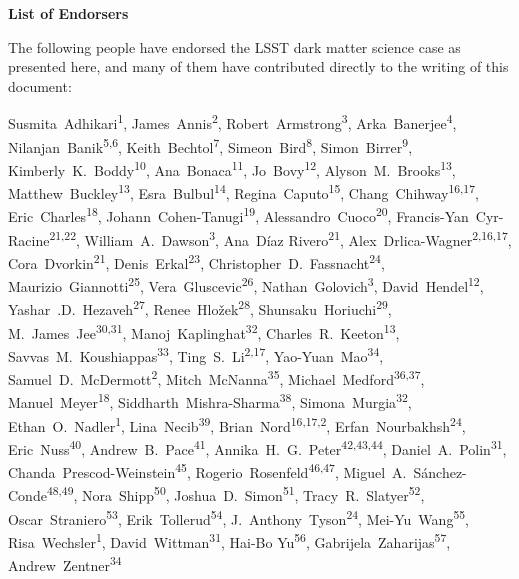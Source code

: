 
\begin{center}
  {\Large \bf List of Endorsers}
\end{center}
\bigskip

The following people have endorsed the LSST dark matter science case as presented here, and many of them have contributed directly to the writing of this document:

\def\altaffilmark#1{\textsuperscript{#1}}
\def\affil#1{\noindent #1 \\}

\normalsize
\begin{raggedright}

Susmita~Adhikari\altaffilmark{1},
James~Annis\altaffilmark{2},
Robert~Armstrong\altaffilmark{3},
Arka~Banerjee\altaffilmark{4},
Nilanjan~Banik\altaffilmark{5,6},
Keith~Bechtol\altaffilmark{7},
Simeon~Bird\altaffilmark{8},
Simon~Birrer\altaffilmark{9},
Kimberly~K.~Boddy\altaffilmark{10},
Ana~Bonaca\altaffilmark{11},
Jo~Bovy\altaffilmark{12},
Alyson~M.~Brooks\altaffilmark{13},
Matthew~Buckley\altaffilmark{13},
Esra~Bulbul\altaffilmark{14},
Regina~Caputo\altaffilmark{15},
Chang~Chihway\altaffilmark{16,17},
Eric~Charles\altaffilmark{18},
Johann~Cohen-Tanugi\altaffilmark{19},
Alessandro~Cuoco\altaffilmark{20},
Francis-Yan~Cyr-Racine\altaffilmark{21,22},
William~A.~Dawson\altaffilmark{3},
Ana~D\'{i}az Rivero\altaffilmark{21},
Alex~Drlica-Wagner\altaffilmark{2,16,17},
Cora~Dvorkin\altaffilmark{21},
Denis~Erkal\altaffilmark{23},
Christopher~D.~Fassnacht\altaffilmark{24},
Maurizio~Giannotti\altaffilmark{25},
Vera~Gluscevic\altaffilmark{26},
Nathan~Golovich\altaffilmark{3},
David~Hendel\altaffilmark{12},
Yashar~.D.~Hezaveh\altaffilmark{27},
Renee~Hlo\v{z}ek\altaffilmark{28},
Shunsaku~Horiuchi\altaffilmark{29},
M.~James~Jee\altaffilmark{30,31},
Manoj~Kaplinghat\altaffilmark{32},
Charles~R.~Keeton\altaffilmark{13},
Savvas~M.~Koushiappas\altaffilmark{33},
Ting~S.~Li\altaffilmark{2,17},
Yao-Yuan~Mao\altaffilmark{34},
Samuel~D.~McDermott\altaffilmark{2},
Mitch~McNanna\altaffilmark{35},
Michael~Medford\altaffilmark{36,37},
Manuel~Meyer\altaffilmark{18},
Siddharth~Mishra-Sharma\altaffilmark{38},
Simona~Murgia\altaffilmark{32},
Ethan~O.~Nadler\altaffilmark{1},
Lina~Necib\altaffilmark{39},
Brian~Nord\altaffilmark{16,17,2},
Erfan~Nourbakhsh\altaffilmark{24},
Eric~Nuss\altaffilmark{40},
Andrew~B.~Pace\altaffilmark{41},
Annika~H.~G.~Peter\altaffilmark{42,43,44},
Daniel~A.~Polin\altaffilmark{31},
Chanda~Prescod-Weinstein\altaffilmark{45},
Rogerio~Rosenfeld\altaffilmark{46,47},
Miguel~A.~S\'anchez-Conde\altaffilmark{48,49},
Nora~Shipp\altaffilmark{50},
Joshua~D.~Simon\altaffilmark{51},
Tracy~R.~Slatyer\altaffilmark{52},
Oscar~Straniero\altaffilmark{53},
Erik~Tollerud\altaffilmark{54},
J.~Anthony~Tyson\altaffilmark{24},
Mei-Yu~Wang\altaffilmark{55},
Risa~Wechsler\altaffilmark{1},
David~Wittman\altaffilmark{31},
Hai-Bo Yu\altaffilmark{56},
Gabrijela~Zaharijas\altaffilmark{57},
Andrew~Zentner\altaffilmark{34}


\end{raggedright}
